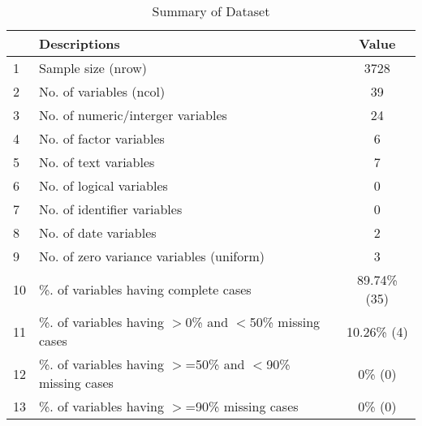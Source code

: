 \begin{table}[ht]
\centering
\caption{Summary of Dataset} 
\begin{tabular}{llc}
  \hline
 & Descriptions & Value \\ 
  \hline
1 & Sample size (nrow) & 3728 \\ 
  2 & No. of variables (ncol) & 39 \\ 
  3 & No. of numeric/interger variables & 24 \\ 
  4 & No. of factor variables & 6 \\ 
  5 & No. of text variables & 7 \\ 
  6 & No. of logical variables & 0 \\ 
  7 & No. of identifier variables & 0 \\ 
  8 & No. of date variables & 2 \\ 
  9 & No. of zero variance variables (uniform) & 3 \\ 
  10 & \%. of variables having complete cases & 89.74\% (35) \\ 
  11 & \%. of variables having $>$0\% and $<$50\% missing cases & 10.26\% (4) \\ 
  12 & \%. of variables having $>$=50\% and $<$90\% missing cases & 0\% (0) \\ 
  13 & \%. of variables having $>$=90\% missing cases & 0\% (0) \\ 
   \hline
\end{tabular}
\end{table}
